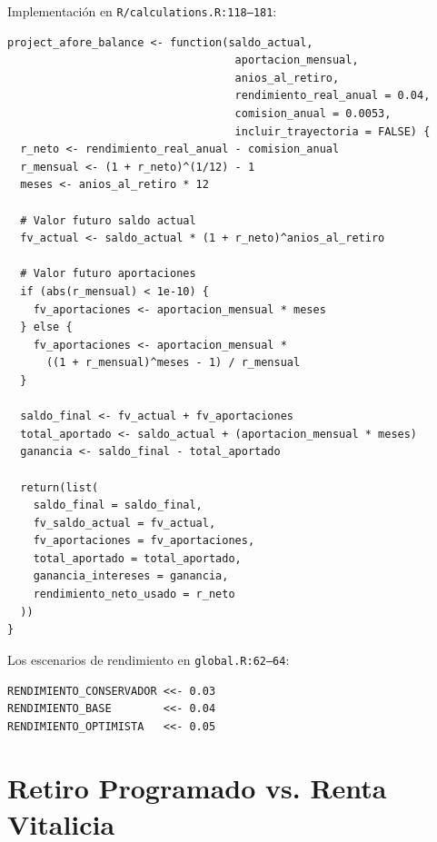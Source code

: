 \documentclass[11pt,a4paper]{report}
\begin{document}
\begin{tcolorbox}[colback=orange!5!white, colframe=orange!75!black, title=\textbf{Aplicaci\'on en C\'odigo}]
Implementaci\'on en \texttt{R/calculations.R:118--181}:

\begin{lstlisting}
project_afore_balance <- function(saldo_actual,
                                   aportacion_mensual,
                                   anios_al_retiro,
                                   rendimiento_real_anual = 0.04,
                                   comision_anual = 0.0053,
                                   incluir_trayectoria = FALSE) {
  r_neto <- rendimiento_real_anual - comision_anual
  r_mensual <- (1 + r_neto)^(1/12) - 1
  meses <- anios_al_retiro * 12

  # Valor futuro saldo actual
  fv_actual <- saldo_actual * (1 + r_neto)^anios_al_retiro

  # Valor futuro aportaciones
  if (abs(r_mensual) < 1e-10) {
    fv_aportaciones <- aportacion_mensual * meses
  } else {
    fv_aportaciones <- aportacion_mensual *
      ((1 + r_mensual)^meses - 1) / r_mensual
  }

  saldo_final <- fv_actual + fv_aportaciones
  total_aportado <- saldo_actual + (aportacion_mensual * meses)
  ganancia <- saldo_final - total_aportado

  return(list(
    saldo_final = saldo_final,
    fv_saldo_actual = fv_actual,
    fv_aportaciones = fv_aportaciones,
    total_aportado = total_aportado,
    ganancia_intereses = ganancia,
    rendimiento_neto_usado = r_neto
  ))
}
\end{lstlisting}

Los escenarios de rendimiento en \texttt{global.R:62--64}:
\begin{lstlisting}
RENDIMIENTO_CONSERVADOR <<- 0.03
RENDIMIENTO_BASE        <<- 0.04
RENDIMIENTO_OPTIMISTA   <<- 0.05
\end{lstlisting}
\end{tcolorbox}

\section{Retiro Programado vs. Renta Vitalicia}
\end{document}
